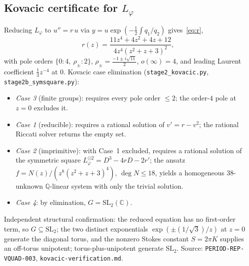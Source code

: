 \documentclass[11pt,reqno]{amsart}
\theoremstyle{plain}
\theoremstyle{definition}
\newcommand{\Lphi}{L_{\varphi}}
\newcommand{\SL}{\mathrm{SL}}
\begin{document}
\subsection{Kovacic certificate for \texorpdfstring{$\Lphi$}{Lphi}}\label{app:kovacic}
Reducing $\Lphi$ to $u''=r\,u$ via $y=u\exp(-\tfrac12\int q_1/q_2)$ gives~\eqref{eq:r},
\[
  r(z)=\frac{11z^4+4z^2+4z+12}{4z^4(z^2+z+3)^2},
\]
with pole orders $\{0:4,\ \rho_\pm:2\}$, $\rho_\pm=\tfrac{-1\pm i\sqrt{11}}2$, $o(\infty)=4$, and
leading Laurent coefficient $\tfrac13 z^{-4}$ at $0$. Kovacic case elimination
(\texttt{stage2\_kovacic.py}, \texttt{stage2b\_symsquare.py}):
\begin{itemize}[leftmargin=1.4em,itemsep=1pt]
  \item \emph{Case 3} (finite groups): requires every pole order $\le2$; the order-$4$ pole at
        $z=0$ excludes it.
  \item \emph{Case 1} (reducible): requires a rational solution of $v'=r-v^2$; the rational
        Riccati solver returns the empty set.
  \item \emph{Case 2} (imprimitive): with Case~1 excluded, requires a rational solution of the
        symmetric square $\Lphi^{\odot2}=D^3-4rD-2r'$; the ansatz $f=N(z)/(z^8(z^2+z+3)^4)$,
        $\deg N\le18$, yields a homogeneous $38$-unknown $\mathbb{Q}$-linear system with only the
        trivial solution.
  \item \emph{Case 4}: by elimination, $G=\SL_2(\mathbb{C})$.
\end{itemize}
Independent structural confirmation: the reduced equation has no first-order term, so
$G\subseteq\SL_2$; the two distinct exponentials $\exp(\pm(1/\sqrt3)/z)$ at $z=0$ generate the
diagonal torus, and the nonzero Stokes constant $S=2\pi K$ supplies an off-torus unipotent;
torus-plus-unipotent generate $\SL_2$. Source: \texttt{PERIOD-REP-VQUAD-003},
\texttt{kovacic-verification.md}.
\end{document}
